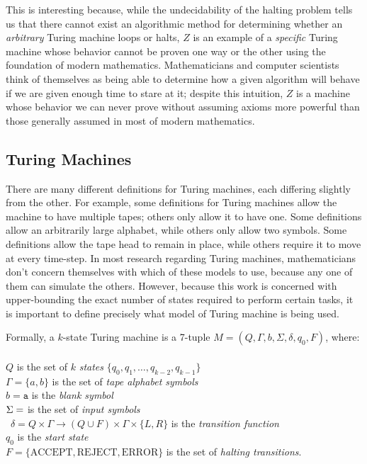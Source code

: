 \documentclass[11pt]{article}
\begin{document}
This is interesting because, while the undecidability of the halting problem tells us that there cannot exist an algorithmic method for determining whether an \emph{arbitrary} Turing machine loops or halts, $Z$ is an example of a \emph{specific} Turing machine whose behavior cannot be proven one way or the other using the foundation of modern mathematics. Mathematicians and computer scientists think of themselves as being able to determine how a given algorithm will behave if we are given enough time to stare at it; despite this intuition, $Z$ is a machine whose behavior we can never prove without assuming axioms more powerful than those generally assumed in most of modern mathematics. 

\subsection{Turing Machines \label{sec:tm}}

There are many different definitions for Turing machines, each differing slightly from the other. For example, some definitions for Turing machines allow the machine to have multiple tapes; others only allow it to have one. Some definitions allow an arbitrarily large alphabet, while others only allow two symbols. Some definitions allow the tape head to remain in place, while others require it to move at every time-step. In most research regarding Turing machines, mathematicians don't concern themselves with which of these models to use, because any one of them can simulate the others. However, because this work is concerned with upper-bounding the exact number of states required to perform certain tasks, it is important to define precisely what model of Turing machine is being used. 

Formally, a $k$-state Turing machine is a 7-tuple $M = (Q, \Gamma, b, \Sigma, \delta, q_0, F)$, where: \\ \\
$Q$ is the set of $k$ \emph{states} $\{q_0, q_1, \dots, q_{k-2}, q_{k-1}\}$ \\
$\Gamma = \{a, b\}$ is the set of \emph{tape alphabet symbols} \\
$b = \texttt{a}$ is the \emph{blank symbol} \\
$\Sigma = \empty$ is the set of \emph{input symbols} \\\
$\delta = Q \times \Gamma \rightarrow (Q \cup F) \times \Gamma \times \{L, R\}$ is the \emph{transition function} \\
$q_0$ is the \emph{start state} \\
$F = \{\textrm{ACCEPT}, \textrm{REJECT}, \textrm{ERROR}\}$ is the set of \emph{halting transitions}. \\
\end{document}
